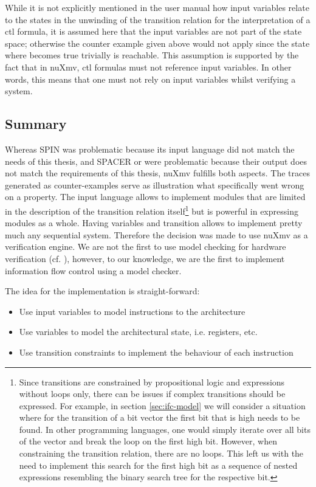 \begin{example}
    While it is not explicitly mentioned in the user manual how input variables relate to the states in the unwinding of the transition relation for the interpretation of a \gls{ctl} formula, it is assumed here that the input variables are not part of the state space; otherwise the counter example given above would not apply since the state where  becomes true trivially is reachable.
    This assumption is supported by the fact that in nuXmv, \gls{ctl} formulas must not reference input variables.
    In other words, this means that one must not rely on input variables whilst verifying a system.
\end{example}

\subsection{Summary}

Whereas SPIN was problematic because its input language did not match the needs of this thesis, and SPACER or \muZ{} were problematic because their output does not match the requirements of this thesis, nuXmv fulfills both aspects.
The traces generated as counter-examples serve as illustration what specifically went wrong on a property.
The input language allows to implement modules that are limited in the description of the transition relation itself\footnote{%
    Since transitions are constrained by propositional logic and expressions without loops only, there can be issues if complex transitions should be expressed.
    For example, in section \ref{sec:ifc-model} we will consider a situation where for the transition of a bit vector the first bit that is high needs to be found.
    In other programming languages, one would simply iterate over all bits of the vector and break the loop on the first high bit.
    However, when constraining the transition relation, there are no loops.
    This left us with the need to implement this search for the first high bit as a sequence of nested  expressions resembling the binary search tree for the respective bit.
} but is powerful in expressing modules as a whole.
Having variables and transition allows to implement pretty much any sequential system.
Therefore the decision was made to use nuXmv as a verification engine.
We are not the first to use model checking for hardware verification (cf. \cite{Krieg14, Irfan16, BradfieldS16}), however, to our knowledge, we are the first to implement information flow control using a model checker.

The idea for the implementation is straight-forward:
\begin{itemize}
    \item Use input variables to model instructions to the architecture
    \item Use variables to model the architectural state, i.e. registers, etc.
    \item Use transition constraints to implement the behaviour of each instruction
\end{itemize}

